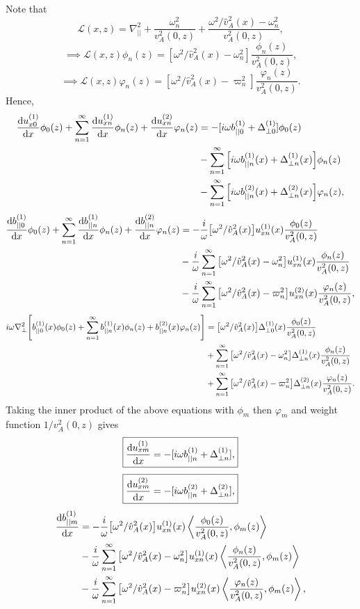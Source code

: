 \documentclass{article}
\begin{document}
Note that
\[\mathcal{L}(x,z)=\nabla_{||}^2+\frac{\omega_n^2}{v_A^2(0,z)}+\frac{\omega^2/\hat{v}_A^2(x) - \omega_n^2}{v_{A}^2(0,z)},\]
\[\implies \mathcal{L}(x,z)\phi_n(z) = [\omega^2/\hat{v}_A^2(x) - \omega_n^2]\frac{\phi_n(z)}{v_A^2(0,z)},\]
\[\implies \mathcal{L}(x,z)\varphi_n(z) = [\omega^2/\hat{v}_A^2(x) - \varpi_n^2]\frac{\varphi_n(z)}{v_A^2(0,z)}.\]
Hence,
\[\begin{aligned}
\dv{u_{x0}^{(1)}}{x}\phi_0(z)+\sum_{n=1}^\infty \dv{u_{xn}^{(1)}}{x}\phi_n(z) + \dv{u_{xn}^{(2)}}{x}\varphi_n(z)&=-[i\omega b_{||0}^{(1)}+\Delta_{\perp0}^{(1)}]\phi_0(z) \\
&-\sum_{n=1}^\infty\qty[i\omega b_{||n}^{(1)}(x) + \Delta_{\perp n}^{(1)}(x)]\phi_n(z) \\
&-\sum_{n=1}^\infty\qty[i\omega b_{||n}^{(2)}(x) + \Delta_{\perp n}^{(2)}(x)]\varphi_n(z),
\end{aligned}\]
\[\begin{aligned}
\dv{b_{||0}^{(1)}}{x}\phi_0(z)+\sum_{n=1}^\infty \dv{b_{||n}^{(1)}}{x}\phi_n(z) + \dv{b_{||n}^{(2)}}{x}\varphi_n(z)&=-\frac{i}{\omega}\qty[\omega^2/\hat{v}_A^2(x)]u_{xn}^{(1)}(x)\frac{\phi_0(z)}{v_A^2(0,z)} \\
&-\frac{i}{\omega}\sum_{n=1}^\infty\qty[\omega^2/\hat{v}_A^2(x) - \omega_n^2]u_{xn}^{(1)}(x)\frac{\phi_n(z)}{v_A^2(0,z)} \\
&-\frac{i}{\omega}\sum_{n=1}^\infty\qty[\omega^2/\hat{v}_A^2(x) - \varpi_n^2]u_{xn}^{(2)}(x)\frac{\varphi_n(z)}{v_A^2(0,z)},
\end{aligned}\]
\[\begin{aligned}
i\omega\nabla_\perp^2 \qty[b_{||0}^{(1)}(x)\phi_0(z)+\sum_{n=1}^\infty b_{||n}^{(1)}(x)\phi_n(z) + b_{||n}^{(2)}(x)\varphi_n(z)]&=\qty[\omega^2/\hat{v}_A^2(x)]\Delta_{\perp 0}^{(1)}(x)\frac{\phi_0(z)}{v_A^2(0,z)} \\
&+\sum_{n=1}^\infty\qty[\omega^2/\hat{v}_A^2(x) - \omega_n^2]\Delta_{\perp n}^{(1)}(x)\frac{\phi_n(z)}{v_A^2(0,z)} \\
&+\sum_{n=1}^\infty\qty[\omega^2/\hat{v}_A^2(x) - \varpi_n^2]\Delta_{\perp n}^{(2)}(x)\frac{\varphi_n(z)}{v_A^2(0,z)}.
\end{aligned}\]
Taking the inner product of the above equations with $\phi_m$ then $\varphi_m$ and weight function $1/v_A^2(0,z)$ gives
\[\boxed{\dv{u_{xm}^{(1)}}{x}=-[i\omega b_{||n}^{(1)} + \Delta_{\perp n}^{(1)}],}\]
\[\boxed{\dv{u_{xm}^{(2)}}{x}=-[i\omega b_{||n}^{(2)} + \Delta_{\perp n}^{(2)}],}\]
\[\begin{aligned}
\dv{b_{||m}^{(1)}}{x}&=-\frac{i}{\omega}\qty[\omega^2/\hat{v}_A^2(x)]u_{xn}^{(1)}(x)\left\langle\frac{\phi_0(z)}{v_A^2(0,z)},\phi_m(z)\right\rangle \\
&-\frac{i}{\omega}\sum_{n=1}^\infty\qty[\omega^2/\hat{v}_A^2(x) - \omega_n^2]u_{xn}^{(1)}(x)\left\langle\frac{\phi_n(z)}{v_A^2(0,z)},\phi_m(z)\right\rangle \\
&-\frac{i}{\omega}\sum_{n=1}^\infty\qty[\omega^2/\hat{v}_A^2(x) - \varpi_n^2]u_{xn}^{(2)}(x)\left\langle\frac{\varphi_n(z)}{v_A^2(0,z)},\phi_m(z)\right\rangle,
\end{aligned}\]
\end{document}
